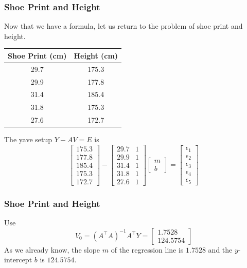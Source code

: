 \documentclass[xcolor=dvipsnames]{beamer}
\begin{document}
\begin{frame}
  \frametitle{Shoe Print and Height}
  Now that we have a formula, let us return to the problem of shoe
  print and height.

  \begin{flushright}
    \begin{tabular}{|c|c|}\hline
    Shoe Print (cm) & Height (cm) \\ \hline
    29.7 & 175.3 \\ \hline
    29.9 & 177.8 \\ \hline
    31.4 & 185.4 \\ \hline
    31.8 & 175.3 \\ \hline
    27.6 & 172.7 \\ \hline
  \end{tabular}
  \end{flushright}

  The yave setup $Y-AV=E$ is
  \begin{equation}
    \label{eq:zeengaip}
    \left[
      \begin{array}{c}
    175.3 \\
    177.8 \\
    185.4 \\
    175.3 \\
    172.7 
      \end{array}\right]-\left[
      \begin{array}{cc}
    29.7 & 1 \\
    29.9 & 1 \\
    31.4 & 1 \\
    31.8 & 1 \\
    27.6 & 1
      \end{array}\right]\left[
      \begin{array}{c}
        m \\
        b
      \end{array}\right]=\left[
    \begin{array}{c}
      \epsilon_{1} \\
      \epsilon_{2} \\
      \epsilon_{3} \\
      \epsilon_{4} \\
      \epsilon_{5}
    \end{array}\right]
  \end{equation}
\end{frame}

\begin{frame}
  \frametitle{Shoe Print and Height}
  Use
  \begin{equation}
    \label{eq:ciephini}
    V_{0}=(A^{\intercal}A)^{-1}A^{\intercal}Y=\left[
      \begin{array}{c}
        1.7528 \\
        124.5754
      \end{array}\right]
  \end{equation}
As we already know, the slope $m$ of the regression line is $1.7528$
and the $y$-intercept $b$ is $124.5754$.
\end{frame}
\end{document}
